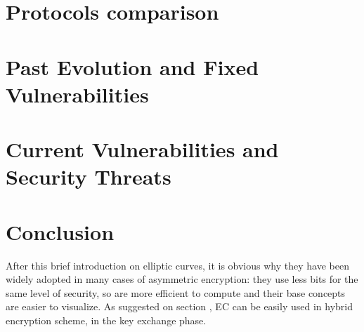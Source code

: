 \documentclass{article}
\begin{document}

\section{Protocols comparison}


 

\section{Past Evolution and Fixed Vulnerabilities}




\section{Current Vulnerabilities and Security Threats}


\section{Conclusion}

After this brief introduction on elliptic curves, it is obvious why they have been widely adopted in many cases of asymmetric encryption: they use less bits for the same level of security, so are more efficient to compute and their base concepts are easier to visualize. As suggested on section , EC can be easily used in hybrid encryption scheme, in the key exchange phase.






\end{document}
